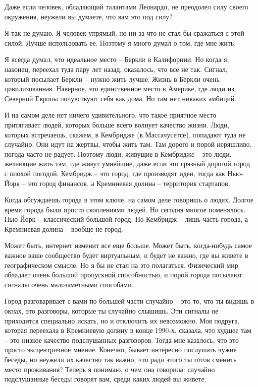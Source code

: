 \documentclass[ebook,12pt,oneside,openany]{memoir}
\begin{document}
Даже если человек, обладающий талантами Леонардо, не преодолел силу
своего окружения, неужели вы думаете, что вам это под силу?

Я так не думаю. Я человек упрямый, но ни за что не стал бы сражаться с
этой силой. Лучше использовать ее. Поэтому я много думал о том, где
мне жить.

Я всегда думал, что идеальное место – Беркли в Калифорнии. Но когда я,
наконец, переехал туда пару лет назад, оказалось, что все не так.
Сигнал, который посылает Беркли – нужно жить лучше. Жизнь в Беркли
очень цивилизованная. Наверное, это единственное место в Америке, где
люди из Северной Европы почувствуют себя как дома. Но там нет никаких
амбиций.

И на самом деле нет ничего удивительного, что такое приятное место
притягивает людей, которых больше всего волнует качество жизни. Люди,
которых встречаешь, скажем, в Кембридже (в Массачусетсе), попадают
туда не случайно. Они идут на жертвы, чтобы жить там. Там дорого и
порой неряшливо, погода часто не радует. Поэтому люди, живущие в
Кембридже – это люди, желающие жить там, где живут умнейшие, даже если
это грязный дорогой город с плохой погодой. Кембридж – это город, где
производят идеи, тогда как Нью-Йорк – это город финансов, а Кремниевая
долина – территория стартапов.


Когда обсуждаешь города в этом ключе, на самом деле говоришь о людях.
Долгое время города были просто скоплениями людей. Но сегодня многое
поменялось. Нью-Йорк – классический большой город. Но Кембридж – лишь
часть города, а Кремниевая долина – вообще не город.

Может быть, интернет изменит все еще больше. Может быть, когда-нибудь
самое важное ваше сообщество будет виртуальным, и будет не важно, где
вы живете в географическом смысле. Но я бы не стал на это полагаться.
Физический мир обладает очень большой пропускной способностью, и порой
города посылают сигналы очень малозаметными способами.

Город разговаривает с вами по большей части случайно – это то, что ты
видишь в окнах, это разговоры, которые ты случайно слышишь. Эти
сигналы не приходится специально искать, но и отключить их невозможно.
Моя подруга, которая переехала в Кремниевую долину в конце 1990-х,
сказала, что худшее там – это низкое качество подслушанных разговоров.
Тогда мне казалось, что это просто эксцентричное мнение. Конечно,
бывает интересно послушать чужие беседы, но неужели их качество так
важно, что ради этого ты готов сменить место проживания? Теперь я
понимаю, о чем она говорила: случайно подслушанные беседы говорят вам,
среди каких людей вы живете.
\end{document}
